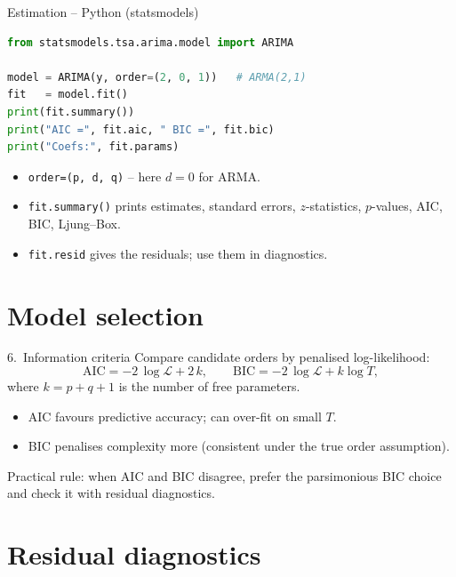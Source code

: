 \documentclass[aspectratio=169]{beamer}
\begin{document}
\begin{frame}[fragile]{Estimation -- Python (statsmodels)}
\begin{lstlisting}[language=Python]
from statsmodels.tsa.arima.model import ARIMA

model = ARIMA(y, order=(2, 0, 1))   # ARMA(2,1)
fit   = model.fit()
print(fit.summary())
print("AIC =", fit.aic, " BIC =", fit.bic)
print("Coefs:", fit.params)
\end{lstlisting}
  \begin{itemize}
    \item \texttt{order=(p, d, q)} -- here $d = 0$ for ARMA.
    \item \texttt{fit.summary()} prints estimates, standard errors,
          $z$-statistics, $p$-values, AIC, BIC, Ljung--Box.
    \item \texttt{fit.resid} gives the residuals; use them in
          diagnostics.
  \end{itemize}
\end{frame}

\section{Model selection}

\begin{frame}{6.~Information criteria}
  Compare candidate orders by penalised log-likelihood:
  \[
    \mathrm{AIC} = -2\, \log \mathcal L + 2\,k,
    \qquad
    \mathrm{BIC} = -2\, \log \mathcal L + k \log T,
  \]
  where $k = p + q + 1$ is the number of free parameters.
  \pause
  \begin{itemize}
    \item AIC favours predictive accuracy; can over-fit on small $T$.
    \item BIC penalises complexity more (consistent under the true
          order assumption).
  \end{itemize}
  \alert{Practical rule:} when AIC and BIC disagree, prefer the
  parsimonious BIC choice and check it with residual diagnostics.
\end{frame}

\section{Residual diagnostics}
\end{document}
